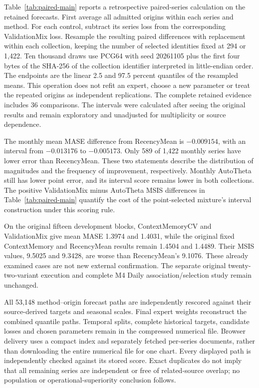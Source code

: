 \documentclass[11pt,a4paper]{article}
\begin{document}
Table~\ref{tab:paired-main} reports a retrospective paired-series calculation on the retained forecasts. First average all admitted origins within each series and method. For each control, subtract its series loss from the corresponding ValidationMix loss. Resample the resulting paired differences with replacement within each collection, keeping the number of selected identities fixed at 294 or 1,422. Ten thousand draws use PCG64 with seed 20261105 plus the first four bytes of the SHA-256 of the collection identifier interpreted in little-endian order. The endpoints are the linear 2.5 and 97.5 percent quantiles of the resampled means. This operation does not refit an expert, choose a new parameter or treat the repeated origins as independent replications. The complete retained evidence includes 36 comparisons. The intervals were calculated after seeing the original results and remain exploratory and unadjusted for multiplicity or source dependence.


The monthly mean MASE difference from RecencyMean is $-0.009154$, with an interval from $-0.013176$ to $-0.005173$. Only 589 of 1,422 monthly series have lower error than RecencyMean. These two statements describe the distribution of magnitudes and the frequency of improvement, respectively. Monthly AutoTheta still has lower point error, and its interval score remains lower in both collections. The positive ValidationMix minus AutoTheta MSIS differences in Table~\ref{tab:paired-main} quantify the cost of the point-selected mixture's interval construction under this scoring rule.

On the original fifteen development blocks, ContextMemoryCV and ValidationMix give mean MASE 1.3974 and 1.4031, while the original fixed ContextMemory and RecencyMean results remain 1.4504 and 1.4489. Their MSIS values, 9.5025 and 9.3428, are worse than RecencyMean's 9.1076. These already examined cases are not new external confirmation. The separate original twenty-two-variant execution and complete M4 Daily association/selection study remain unchanged.

All 53,148 method--origin forecast paths are independently rescored against their source-derived targets and seasonal scales. Final expert weights reconstruct the combined quantile paths. Temporal splits, complete historical targets, candidate losses and chosen parameters remain in the compressed numerical file. Browser delivery uses a compact index and separately fetched per-series documents, rather than downloading the entire numerical file for one chart. Every displayed path is independently checked against its stored score. Exact duplicates do not imply that all remaining series are independent or free of related-source overlap; no population or operational-superiority conclusion follows.
\end{document}
